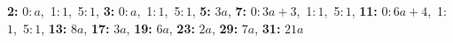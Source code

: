 \textsf{\bfseries 2:} 0:\,$a$,\ 1:\,$1$,\ 5:\,$1$, \textsf{\bfseries 3:} 0:\,$a$,\ 1:\,$1$,\ 5:\,$1$, \textsf{\bfseries 5:} $3a$, \textsf{\bfseries 7:} 0:\,$3a + 3$,\ 1:\,$1$,\ 5:\,$1$, \textsf{\bfseries 11:} 0:\,$6a + 4$,\ 1:\,$1$,\ 5:\,$1$, \textsf{\bfseries 13:} $8a$, \textsf{\bfseries 17:} $3a$, \textsf{\bfseries 19:} $6a$, \textsf{\bfseries 23:} $2a$, \textsf{\bfseries 29:} $7a$, \textsf{\bfseries 31:} $21a$